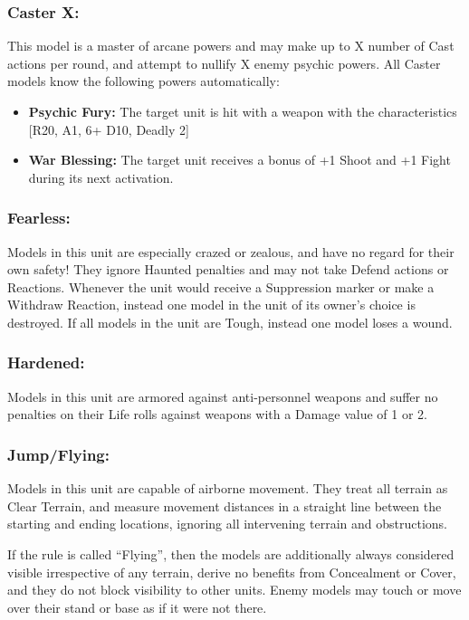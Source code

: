 \begin{multicols}{2}
\subsubsection*{Caster X:} This model is a master of arcane powers and may make up to X number of Cast actions per round, and attempt to nullify X enemy psychic powers. All Caster models know the following powers automatically:

\begin{itemize}
    \item \textbf{Psychic Fury:} The target unit is hit with a weapon with the characteristics [R20, A1, 6+ D10, Deadly 2]
    \item \textbf{War Blessing:} The target unit receives a bonus of +1 Shoot and +1 Fight during its next activation.
\end{itemize}

\subsubsection*{Fearless:} Models in this unit are especially crazed or zealous, and have no regard for their own safety! They ignore Haunted penalties and may not take Defend actions or Reactions. Whenever the unit would receive a Suppression marker or make a Withdraw Reaction, instead one model in the unit of its owner's choice is destroyed. If all models in the unit are Tough, instead one model loses a wound.

\subsubsection*{Hardened:} Models in this unit are armored against anti-personnel weapons and suffer no penalties on their Life rolls against weapons with a Damage value of 1 or 2.

\subsubsection*{Jump/Flying:} Models in this unit are capable of airborne movement. They treat all terrain as Clear Terrain, and measure movement distances in a straight line between the starting and ending locations, ignoring all intervening terrain and obstructions.

If the rule is called ``Flying'', then the models are additionally always considered visible irrespective of any terrain, derive no benefits from Concealment or Cover, and they do not block visibility to other units. Enemy models may touch or move over their stand or base as if it were not there.


\end{multicols}

